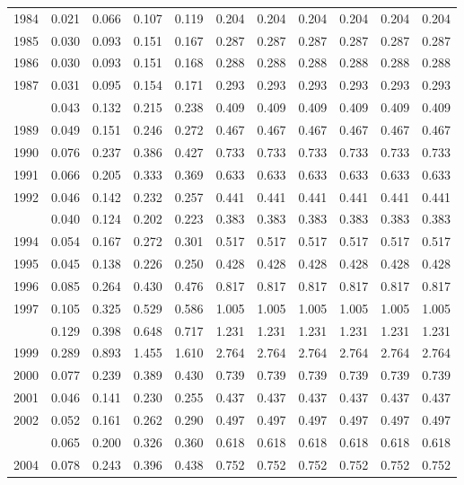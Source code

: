 \documentclass[
]{article}
\begin{document}
\begin{longtable}[t]{lrrrrrrrrrr}
1984 & 0.021 & 0.066 & 0.107 & 0.119 & 0.204 & 0.204 & 0.204 & 0.204 & 0.204 & 0.204\\
1985 & 0.030 & 0.093 & 0.151 & 0.167 & 0.287 & 0.287 & 0.287 & 0.287 & 0.287 & 0.287\\
1986 & 0.030 & 0.093 & 0.151 & 0.168 & 0.288 & 0.288 & 0.288 & 0.288 & 0.288 & 0.288\\
1987 & 0.031 & 0.095 & 0.154 & 0.171 & 0.293 & 0.293 & 0.293 & 0.293 & 0.293 & 0.293\\
\addlinespace
1988 & 0.043 & 0.132 & 0.215 & 0.238 & 0.409 & 0.409 & 0.409 & 0.409 & 0.409 & 0.409\\
1989 & 0.049 & 0.151 & 0.246 & 0.272 & 0.467 & 0.467 & 0.467 & 0.467 & 0.467 & 0.467\\
1990 & 0.076 & 0.237 & 0.386 & 0.427 & 0.733 & 0.733 & 0.733 & 0.733 & 0.733 & 0.733\\
1991 & 0.066 & 0.205 & 0.333 & 0.369 & 0.633 & 0.633 & 0.633 & 0.633 & 0.633 & 0.633\\
1992 & 0.046 & 0.142 & 0.232 & 0.257 & 0.441 & 0.441 & 0.441 & 0.441 & 0.441 & 0.441\\
\addlinespace
1993 & 0.040 & 0.124 & 0.202 & 0.223 & 0.383 & 0.383 & 0.383 & 0.383 & 0.383 & 0.383\\
1994 & 0.054 & 0.167 & 0.272 & 0.301 & 0.517 & 0.517 & 0.517 & 0.517 & 0.517 & 0.517\\
1995 & 0.045 & 0.138 & 0.226 & 0.250 & 0.428 & 0.428 & 0.428 & 0.428 & 0.428 & 0.428\\
1996 & 0.085 & 0.264 & 0.430 & 0.476 & 0.817 & 0.817 & 0.817 & 0.817 & 0.817 & 0.817\\
1997 & 0.105 & 0.325 & 0.529 & 0.586 & 1.005 & 1.005 & 1.005 & 1.005 & 1.005 & 1.005\\
\addlinespace
1998 & 0.129 & 0.398 & 0.648 & 0.717 & 1.231 & 1.231 & 1.231 & 1.231 & 1.231 & 1.231\\
1999 & 0.289 & 0.893 & 1.455 & 1.610 & 2.764 & 2.764 & 2.764 & 2.764 & 2.764 & 2.764\\
2000 & 0.077 & 0.239 & 0.389 & 0.430 & 0.739 & 0.739 & 0.739 & 0.739 & 0.739 & 0.739\\
2001 & 0.046 & 0.141 & 0.230 & 0.255 & 0.437 & 0.437 & 0.437 & 0.437 & 0.437 & 0.437\\
2002 & 0.052 & 0.161 & 0.262 & 0.290 & 0.497 & 0.497 & 0.497 & 0.497 & 0.497 & 0.497\\
\addlinespace
2003 & 0.065 & 0.200 & 0.326 & 0.360 & 0.618 & 0.618 & 0.618 & 0.618 & 0.618 & 0.618\\
2004 & 0.078 & 0.243 & 0.396 & 0.438 & 0.752 & 0.752 & 0.752 & 0.752 & 0.752 & 0.752\\

\end{longtable}
\end{document}
